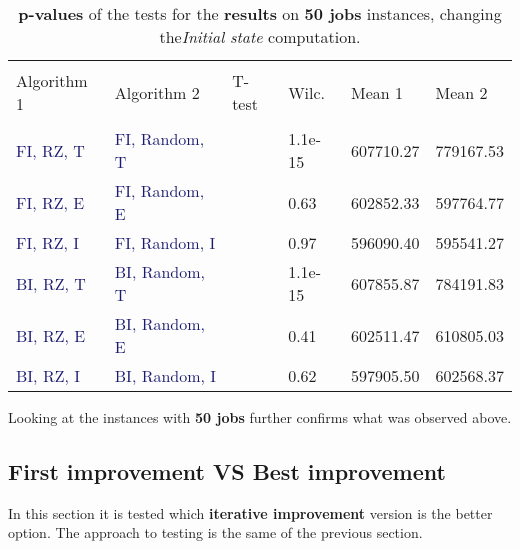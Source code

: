 \documentclass[
12pt,
a4paper,
oneside,
headinclude,
footinclude]{article}
\theoremstyle{definition} %
\begin{document}
\begin{table}[H]
    \begin{tabular}{l l l l l l} %
        \hline
        \hline 
        \\[-1.5ex]
        \textcolor{BrickRed}{Algorithm 1} & \textcolor{BrickRed}{Algorithm 2} & \textcolor{BrickRed}{T-test} & \textcolor{BrickRed}{Wilc.} & \textcolor{BrickRed}{Mean 1} & \textcolor{BrickRed}{Mean 2}\\ [0.5ex]
        \hline %
        \\[-1.5ex]
        \textcolor{MidnightBlue}{FI, RZ, T} & \textcolor{MidnightBlue}{FI, Random, T} &  & 1.1e-15 & 607710.27 & 779167.53 \\ 
        \textcolor{MidnightBlue}{FI, RZ, E} & \textcolor{MidnightBlue}{FI, Random, E} &  & 0.63 &  602852.33 & 597764.77 \\ 
        \textcolor{MidnightBlue}{FI, RZ, I} & \textcolor{MidnightBlue}{FI, Random, I} &  & 0.97 & 596090.40 & 595541.27 \\ 
        \textcolor{MidnightBlue}{BI, RZ, T} & \textcolor{MidnightBlue}{BI, Random, T} &  & 1.1e-15 &   607855.87 & 784191.83 \\ 
        \textcolor{MidnightBlue}{BI, RZ, E} & \textcolor{MidnightBlue}{BI, Random, E} &  & 0.41 & 602511.47 & 610805.03 \\ 
        \textcolor{MidnightBlue}{BI, RZ, I} & \textcolor{MidnightBlue}{BI, Random, I} &  & 0.62 & 597905.50 & 602568.37 \\ 
        [1ex] %
        \hline %
    \end{tabular}
    \caption{\label{tab:ii-initialstate50res}\textbf{p-values} of the tests for the \textbf{results} on \textbf{50 jobs} instances, changing the\textit{Initial state} computation.}
\end{table} 

Looking at the instances with \textbf{50 jobs} further confirms what was observed above.






\subsection{First improvement VS Best improvement}
In this section it is tested which \textbf{iterative improvement} version is the better option. The approach to testing is the same of the previous section.
\end{document}
